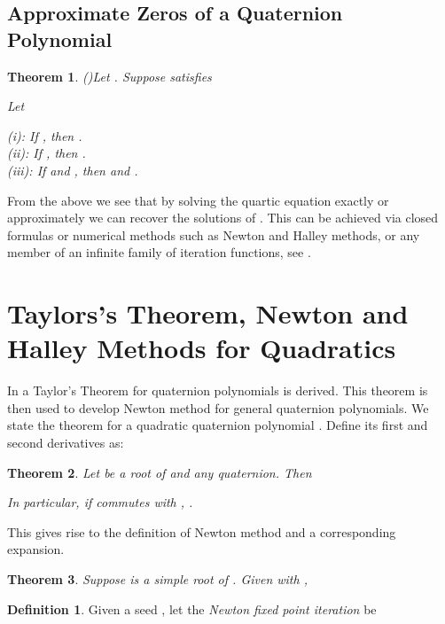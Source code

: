 \documentclass{article}
\newtheorem{thm}{Theorem}
\theoremstyle{definition}
\newtheorem{definition}{Definition}
\begin{document}
\subsection{Approximate Zeros of a Quaternion Polynomial}


\begin{thm} \label{Approx} {\rm (\cite{kalQ})}Let . Suppose  satisfies

Let


(i): If , then .\\

(ii): If , then .\\

(iii): If  and  , then 
and . 
\end{thm}


From the above we see that by solving the quartic equation
 exactly or approximately we can recover the solutions of
. This can be achieved via closed formulas or numerical
methods such as Newton and  Halley methods, or any member of
an infinite family of iteration functions, see \cite{kalbook}.



\section{Taylors's Theorem, Newton and Halley Methods for Quadratics} \label{sectionVIII}

In \cite{kalQ} a Taylor's Theorem for quaternion polynomials is derived. This theorem is then used to develop Newton method for general quaternion polynomials.  We state the theorem for
a quadratic  quaternion polynomial . Define its first and second derivatives as:



\begin{thm} \label{Expansion} Let  be a root of  and  any quaternion. Then

In particular, if  commutes with ,  . 
\end{thm}

This gives rise to the definition of Newton method and a corresponding expansion.

\begin{thm} \label{Newt}  Suppose  is a simple root of . Given  with ,

\end{thm}

\begin{definition} \label{defNewt}
Given a seed , let the {\it Newton fixed point iteration} be

\end{definition}
\end{document}
